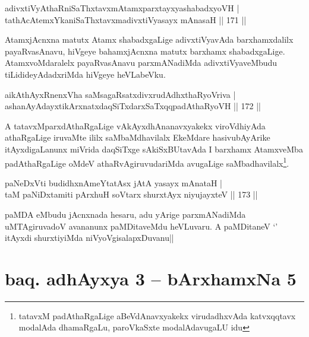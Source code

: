 
\begin{shl}
adivxtiVyAthaRniSaThxtavxmAtamxparxtayxyashabadxyoVH |\\
tathAcA\s \s temxYkaniSaThxtavxmadivxtiVyasayx mAnasaH \hfill || 171 ||
\end{shl}

\begin{artha}
AtamxjAcnxna matutx Atamx shabadxgaLige adivxtiVyavAda barxhamxdalilx payaRvasAnavu, hiVgeye bahamxjAcnxna matutx barxhamx shabadxgaLige. AtamxvoMdaralelx payaRvasAnavu parxmANadiMda adivxtiVyaveMbudu tiLidideyAdadxriMda hiVgeye heVLabeVku.
\end{artha}

\begin{shl}
aikAthAyxRnenxVha saMsagaRsatxdivxrudAdhxthaRyoVriva |\\
ashanAyAdayxtikArxnatxdaqSiTxdarxSaTxqqpadAthaRyoVH \hfill || 172 ||
\end{shl}

\begin{artha}
A tatavxMparxdAthaRgaLige vAkAyxdhAnanavxyakekx viroVdhiyAda athaRgaLige iruvaMte ililx saMbaMdhavilalx EkeMdare hasivubAyArike itAyxdigaLanunx miVrida daqSiTxge sAkiSxBUtavAda I barxhamx AtamxveMba padAthaRgaLige oMdeV athaRvAgiruvudariMda avugaLige saMbadhavilalx\footnote[1]{tatavxM padAthaRgaLige aBeVdAnavxyakekx virudadhxvAda katvxqqtavx modalAda dhamaRgaLu, paroVkaSxte modalAdavugaLU idu}.
\end{artha}


\begin{shl}
paNeDxVti budidhxnAmeYtatAsx jAtA yasayx mAnataH |\\
taM paNiDxtamiti pArxhuH soV\s tarx shurxtAyx niyujayxteV \hfill || 173 ||
\end{shl}

\begin{artha}
paMDA eMbudu jAcnxnada hesaru, adu yArige parxmANadiMda uMTAgiruvadoV avananunx paMDitaveMdu heVLuvaru. A paMDitaneV `\stext ' itAyxdi shurxtiyiMda niVyoVgisalapxDuvanu||
\end{artha}

\section*{baq. adhAyxya 3 -- bArxhamxNa 5}

